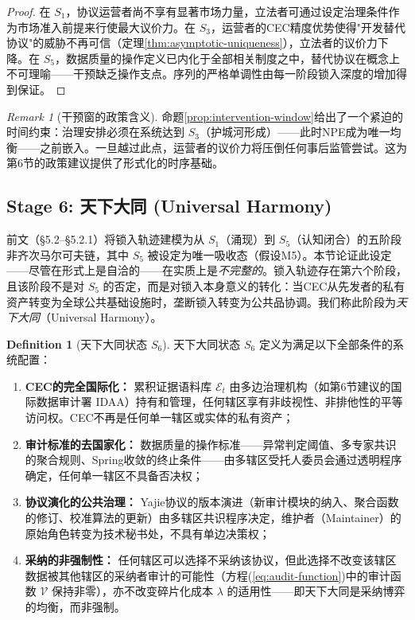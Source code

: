 \documentclass[12pt,a4paper]{ctexart}
\theoremstyle{definition}
\newtheorem{definition}{Definition}[section]
\theoremstyle{remark}
\newtheorem{remark}{Remark}[section]
\begin{document}
\begin{proof}
在 $S_1$，协议运营者尚不享有显著市场力量，立法者可通过设定治理条件作为市场准入前提来行使最大议价力。在 $S_3$，运营者的CEC精度优势使得"开发替代协议"的威胁不再可信（定理\ref{thm:asymptotic-uniqueness}），立法者的议价力下降。在 $S_5$，数据质量的操作定义已内化于全部相关制度之中，替代协议在概念上不可理喻——干预缺乏操作支点。序列的严格单调性由每一阶段锁入深度的增加得到保证。
\end{proof}

\begin{remark}[干预窗的政策含义]
命题\ref{prop:intervention-window}给出了一个紧迫的时间约束：治理安排必须在系统达到 $S_3$（护城河形成）——此时NPE成为唯一均衡——之前嵌入。一旦越过此点，运营者的议价力将压倒任何事后监管尝试。这为第6节的政策建议提供了形式化的时序基础。
\end{remark}

\subsection{Stage 6: 天下大同 (Universal Harmony)}

\label{sec:stage6}

前文（§5.2--§5.2.1）将锁入轨迹建模为从 $S_1$（涌现）到 $S_5$（认知闭合）的五阶段非齐次马尔可夫链，其中 $S_5$ 被设定为唯一吸收态（假设M5）。本节论证此设定——尽管在形式上是自洽的——在实质上是\textit{不完整的}。锁入轨迹存在第六个阶段，且该阶段不是对 $S_5$ 的否定，而是对锁入本身意义的转化：当CEC从先发者的私有资产转变为全球公共基础设施时，垄断锁入转变为公共品协调。我们称此阶段为\textit{天下大同}（Universal Harmony）。

\begin{definition}[天下大同状态 $S_6$]
\label{def:S6}
天下大同状态 $S_6$ 定义为满足以下全部条件的系统配置：
\begin{enumerate}[label=(\roman*), itemsep=2pt]
\item \textbf{CEC的完全国际化：} 累积证据语料库 $\mathcal{E}_t$ 由多边治理机构（如第6节建议的国际数据审计署 IDAA）持有和管理，任何辖区享有非歧视性、非排他性的平等访问权。CEC不再是任何单一辖区或实体的私有资产；
\item \textbf{审计标准的去国家化：} 数据质量的操作标准——异常判定阈值、多专家共识的聚合规则、Spring收敛的终止条件——由多辖区受托人委员会通过透明程序确定，任何单一辖区不具备否决权；
\item \textbf{协议演化的公共治理：} Yajie协议的版本演进（新审计模块的纳入、聚合函数的修订、校准算法的更新）由多辖区共识程序决定，维护者（Maintainer）的原始角色转变为技术秘书处，不具有单边决策权；
\item \textbf{采纳的非强制性：} 任何辖区可以选择不采纳该协议，但此选择不改变该辖区数据被其他辖区的采纳者审计的可能性（方程(\ref{eq:audit-function})中的审计函数 $\mathcal{V}$ 保持非零），亦不改变碎片化成本 $\lambda$ 的适用性——即天下大同是采纳博弈的均衡，而非强制。
\end{enumerate}
\end{definition}
\end{document}
